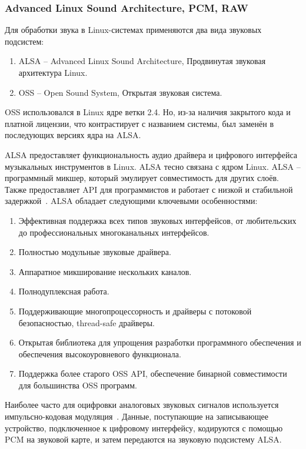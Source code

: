 \subsubsection{Advanced Linux Sound Architecture, PCM, RAW}

Для обработки звука в Linux-системах применяются два вида звуковых подсистем:

\begin{enumerate}
  \item ALSA -- Advanced Linux Sound Architecture, Продвинутая звуковая архитектура Linux.
  \item OSS -- Open Sound System, Открытая звуковая система.
\end{enumerate}

OSS использовался в Linux ядре ветки 2.4. Но, из-за наличия закрытого кода и платной лицензии, что контрастирует с названием системы, был заменён в последующих версиях ядра на ALSA.

ALSA предоставляет функциональность аудио драйвера и цифрового интерфейса музыкальных инструментов в Linux. ALSA тесно связана с ядром Linux. ALSA -- программный микшер, который эмулирует совместимость для других слоёв. Также предоставляет API для программистов и работает с низкой и стабильной задержкой~\cite{alsa-project}. ALSA обладает следующими ключевыми особенностями:

\begin{enumerate}
  \item Эффективная поддержка всех типов звуковых интерфейсов, от любительских до профессиональных многоканальных интерфейсов.
  \item Полностью модульные звуковые драйвера.
  \item Аппаратное микширование нескольких каналов.
  \item Полнодуплексная работа.
  \item Поддерживающие многопроцессорность и драйверы с потоковой безопасностью, thread-safe драйверы.
  \item Открытая библиотека для упрощения разработки программного обеспечения и обеспечения высокоуровневого функционала.
  \item Поддержка более старого OSS API, обеспечение бинарной совместимости для большинства OSS программ.
\end{enumerate}

Наиболее часто для оцифровки аналоговых звуковых сигналов используется импульсно-кодовая модуляция~\cite{alsa-arch}. Данные, поступающие на записывающее устройство, подключенное к цифровому интерфейсу, кодируются с помощью PCM на звуковой карте, и затем передаются на звуковую подсистему ALSA.

